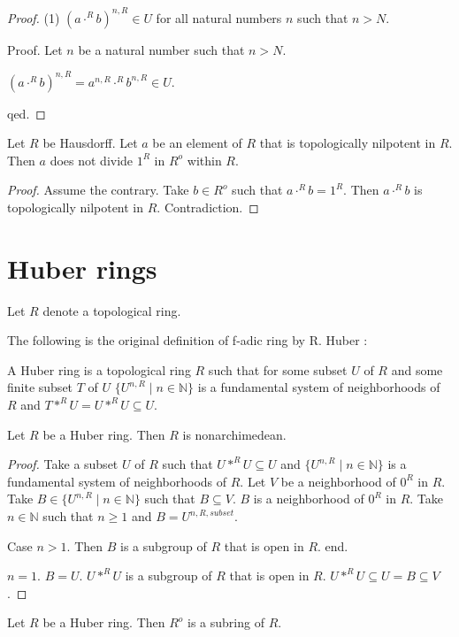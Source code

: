\documentclass[11pt]{article}
\newcommand{\Powers}[2]{\{{#1}^{n,#2} \mid n \in \mathbb{N}\}}
\begin{document}
\begin{forthel}
\begin{proof}
(1) $(a \cdot^{R} b)^{n,R} \in U$ for all natural numbers $n$ such that $n > N$.

Proof. Let $n$ be a natural number such that $n > N$.

$(a \cdot^{R} b)^{n,R} = a^{n,R} \cdot^{R} b^{n,R} \in U$. 

qed. 
\end{proof}

\begin{lemma} Let $R$ be Hausdorff.
Let $a$ be an element of $R$ that is topologically nilpotent in $R$.
Then $a$ does not divide $1^{R}$ in $R^o$ within $R$.
\end{lemma}
\begin{proof}
Assume the contrary. 
Take $b \in R^o$ such that $a \cdot^{R} b = 1^{R}$.
Then  $a \cdot^{R} b$ is topologically nilpotent in $R$.
Contradiction.
\end{proof}

\end{forthel}

\section{Huber rings}
\begin{forthel}

Let $R$ denote a topological ring.
\end{forthel}
The following is the original definition of f-adic ring by R. Huber \cite{Huber1993}:
\begin{forthel}

\begin{definition}
A Huber ring is a topological ring $R$ such that for some subset $U$ of $R$
and some finite subset $T$ of $U$ 
$\Powers{U}{R}$ is a fundamental system of neighborhoods of $R$ and
$T \ast^{R} U = U \ast^{R} U \subseteq U$. 
\end{definition}

\begin{lemma}
Let $R$ be a Huber ring. Then $R$ is nonarchimedean.
\end{lemma}
\begin{proof}
Take a subset $U$ of $R$
such that $U \ast^{R} U \subseteq U$ and 
$\Powers{U}{R}$ is a fundamental system of neighborhoods of $R$.
Let $V$ be a neighborhood of $0^{R}$ in $R$.
Take $B \in \Powers{U}{R}$ such that $B \subseteq V$.
$B$ is a neighborhood of $0^{R}$ in $R$.
Take $n \in \mathbb{N}$ such that $n \geq 1$ and $B = U^{n,R,subset}$.

Case $n > 1$.
Then $B$ is a subgroup of $R$ that is open in $R$.
end.

$n = 1$. $B = U$. $U \ast^{R} U $ is a subgroup
of $R$ that is open in $R$.
$U \ast^{R} U \subseteq U = B \subseteq V$.
\end{proof}

\begin{lemma}
Let $R$ be a Huber ring. Then $R^o$ is a subring of $R$.
\end{lemma}
\end{forthel}
\end{document}
